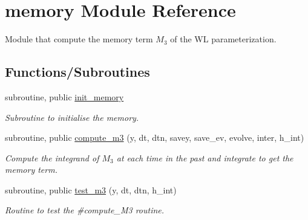 \hypertarget{namespacememory}{}\section{memory Module Reference}
\label{namespacememory}


Module that compute the memory term $M_3$ of the WL parameterization.  


\subsection*{Functions/\+Subroutines}
\begin{DoxyCompactItemize}
\item 
subroutine, public \hyperlink{namespacememory_ab130f53c70f8b6e46e81ce851a1cdce1}{init\+\_\+memory}
\begin{DoxyCompactList}\small\item\em Subroutine to initialise the memory. \end{DoxyCompactList}\item 
subroutine, public \hyperlink{namespacememory_a76521fb2ecada5d623e947547314a5d6}{compute\+\_\+m3} (y, dt, dtn, savey, save\+\_\+ev, evolve, inter, h\+\_\+int)
\begin{DoxyCompactList}\small\item\em Compute the integrand of $M_3$ at each time in the past and integrate to get the memory term. \end{DoxyCompactList}\item 
subroutine, public \hyperlink{namespacememory_a47338910873d83feb93ce970b45f8ed7}{test\+\_\+m3} (y, dt, dtn, h\+\_\+int)
\begin{DoxyCompactList}\small\item\em Routine to test the \#compute\+\_\+\+M3 routine. \end{DoxyCompactList}\end{DoxyCompactItemize}
